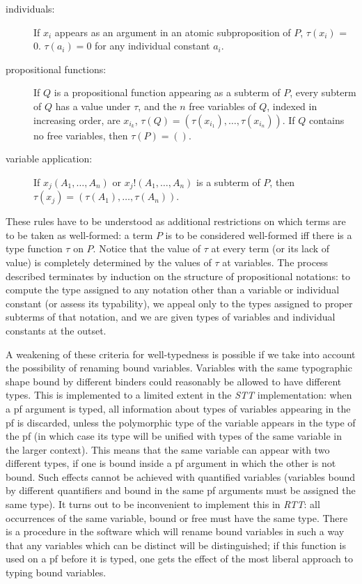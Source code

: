 \documentclass{article}
\begin{document}
\begin{description}

\item[individuals:] If $x_i$ appears as an argument in an atomic
subproposition of $P$, $\tau(x_i)$ = 0.  $\tau(a_i) = 0$ for any
individual constant $a_i$.

\item[propositional functions:] If $Q$ is a propositional function
appearing as a subterm of $P$, every subterm of $Q$ has a value under
$\tau$, and the $n$ free variables of $Q$, indexed in increasing
order, are $x_{i_k}$, $\tau(Q) =
(\tau(x_{i_1}),\ldots,\tau(x_{i_n}))$.  If $Q$ contains no free
variables, then $\tau(P) = ()$.

\item[variable application:] If $x_j(A_1,\ldots,A_n)$ or
$x_j!(A_1,\ldots,A_n)$ is a subterm of $P$, then $\tau(x_j) =
(\tau(A_1),\ldots,\tau(A_n))$.

\end{description}

These rules have to be understood as additional restrictions on
which terms are to be taken as well-formed: a term $P$ is to be considered well-formed
iff there is a type function $\tau$ on $P$.  Notice that the value of
$\tau$ at every term (or its lack of value) is completely determined
by the values of $\tau$ at variables.  The process described
terminates by induction on the structure of propositional notations:
to compute the type assigned to any notation other than a variable or
individual constant (or assess its typability), we appeal only to the
types assigned to proper subterms of that notation, and we are given
types of variables and individual constants at the outset.

A weakening of these criteria for well-typedness is possible if we
take into account the possibility of renaming bound variables.
Variables with the same typographic shape bound by different binders
could reasonably be allowed to have different types.  This is
implemented to a limited extent in the {\em STT\/} implementation:
when a pf argument is typed, all information about types of variables
appearing in the pf is discarded, unless the polymorphic type of the
variable appears in the type of the pf (in which case its type will be
unified with types of the same variable in the larger context).  This
means that the same variable can appear with two different types, if
one is bound inside a pf argument in which the other is not bound.  Such
effects cannot be achieved with quantified variables (variables bound
by different quantifiers and bound in the same pf arguments must be
assigned the same type).  It turns out to be inconvenient to implement
this in {\em RTT\/}: all occurrences of the same variable, bound or
free must have the same type.  There is a procedure in the software
which will rename bound variables in such a way that any variables
which can be distinct will be distinguished; if this function is used
on a pf before it is typed, one gets the effect of the most liberal
approach to typing bound variables.
\end{document}
